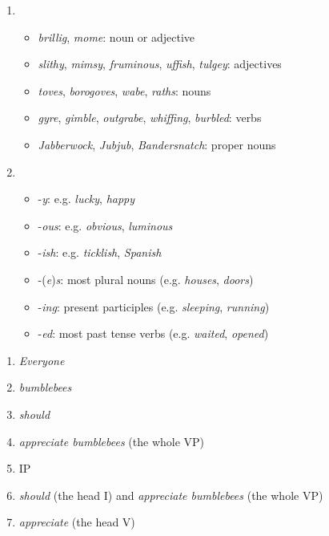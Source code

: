 \noindent\textbf{}
\begin{enumerate}
    \item \begin{itemize}
        \item \emph{brillig}, \emph{mome}: noun or adjective
        \item \emph{slithy}, \emph{mimsy}, \emph{fruminous}, \emph{uffish}, \emph{tulgey}: adjectives
        \item \emph{toves}, \emph{borogoves}, \emph{wabe}, \emph{raths}: nouns
        \item \emph{gyre}, \emph{gimble}, \emph{outgrabe}, \emph{whiffing}, \emph{burbled}: verbs
        \item \emph{Jabberwock}, \emph{Jubjub}, \emph{Bandersnatch}: proper nouns
    \end{itemize}
    \item \begin{itemize}
        \item -\emph{y}: e.g. \emph{lucky}, \emph{happy}
        \item -\emph{ous}: e.g. \emph{obvious}, \emph{luminous}
        \item -\emph{ish}: e.g. \emph{ticklish}, \emph{Spanish}
        \item -(\emph{e})\emph{s}: most plural nouns (e.g. \emph{houses}, \emph{doors})
        \item -\emph{ing}: present participles (e.g. \emph{sleeping}, \emph{running})
        \item -\emph{ed}: most past tense verbs (e.g. \emph{waited}, \emph{opened})
    \end{itemize}
\end{enumerate}

\noindent\textbf{}
\begin{enumerate}
    \item \emph{Everyone}
    \item \emph{bumblebees}
    \item \emph{should}
    \item \emph{appreciate bumblebees} (the whole VP)
    \item IP
    \item \emph{should} (the head I) and \emph{appreciate bumblebees} (the whole VP)
    \item \emph{appreciate} (the head V)
\end{enumerate}

